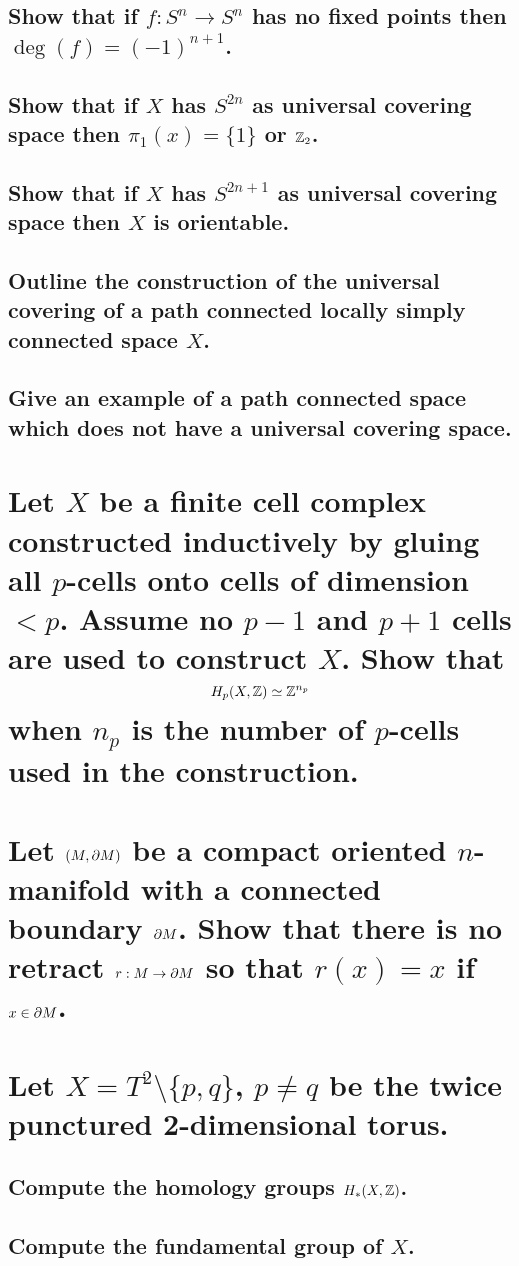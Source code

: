 \documentclass[10pt]{article}
\begin{document}
\subsection{Show that if $f: S^n \to S^n$ has no fixed points then $\deg(f) = (-1)^{n+1}$.}

\subsection{Show that if $X$ has $S^{2n}$ as universal covering space then $\pi_1(x) = \{1\}$ or $\mathbb{Z}_2$.}

\subsection{Show that if $X$ has $S^{2n+1}$ as universal covering space then $X$ is orientable.}

\advsection{}

\subsection{Outline the construction of the universal covering of a path connected locally simply
  connected space $X$.}

\subsection{Give an example of a path connected space which does not have a universal covering space.}

\section{Let $X$ be a finite cell complex constructed inductively by gluing all $p$-cells onto cells
of dimension $<p$. Assume no $p-1$ and $p+1$ cells are used to construct $X$. Show that 
$$H_p(X,\mathbb{Z}) \simeq \mathbb{Z}^{n_p}$$
when $n_p$ is the number of $p$-cells used in the construction.}

\section{Let $(M, \partial M)$ be a compact oriented $n$-manifold with a connected boundary $\partial
  M$. Show that there is no retract $r:M \to \partial M$ so that $r(x) =x$ if $x \in \partial M$. 
}

\section{Let $X = T^2 \setminus \{ p,q\}$, $p \neq q$ be the twice punctured 2-dimensional torus.}

\subsection{Compute the homology groups $H_*(X,\mathbb{Z})$.}

\subsection{Compute the fundamental group of $X$.}
\end{document}
